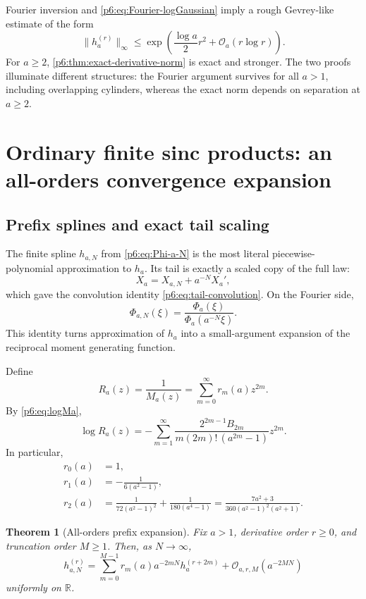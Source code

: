 \documentclass[11pt,oneside]{article}
\numberwithin{equation}{section}
\newtheorem{theorem}{Theorem}[section]
\theoremstyle{definition}
\theoremstyle{remark}
\newcommand{\R}{\mathbb R}
\newcommand{\bigO}{\mathcal O}
\begin{document}
Fourier inversion and \eqref{p6:eq:Fourier-logGaussian} imply a rough
Gevrey-like estimate of the form
\[
 \|h_a^{(r)}\|_\infty
 \le\exp\!\left(\frac{\log a}{2}r^2+\bigO_a(r\log r)\right).
\]
For $a\ge2$, \cref{p6:thm:exact-derivative-norm} is exact and stronger.  The two
proofs illuminate different structures: the Fourier argument survives for all
$a>1$, including overlapping cylinders, whereas the exact norm depends on
separation at $a\ge2$.

\section{Ordinary finite sinc products: an all-orders convergence expansion}

\subsection{Prefix splines and exact tail scaling}

The finite spline $h_{a,N}$ from \eqref{p6:eq:Phi-a-N} is the most literal
piecewise-polynomial approximation to $h_a$.  Its tail is exactly a scaled copy
of the full law:
\[
 X_a=X_{a,N}+a^{-N}X_a',
\]
which gave the convolution identity \eqref{p6:eq:tail-convolution}.  On the Fourier
side,
\begin{equation}\label{p6:eq:prefix-ratio}
 \Phi_{a,N}(\xi)
 =\frac{\Phi_a(\xi)}{\Phi_a(a^{-N}\xi)}.
\end{equation}
This identity turns approximation of $h_a$ into a small-argument expansion of
the reciprocal moment generating function.

Define
\begin{equation}\label{p6:eq:Ra}
 R_a(z)=\frac1{M_a(z)}
 =\sum_{m=0}^{\infty}r_m(a)z^{2m}.
\end{equation}
By \eqref{p6:eq:logMa},
\begin{equation}\label{p6:eq:logRa}
 \log R_a(z)=
 -\sum_{m=1}^{\infty}
 \frac{2^{2m-1}B_{2m}}
 {m(2m)!\,(a^{2m}-1)}z^{2m}.
\end{equation}
In particular,
\begin{align}
 r_0(a)&=1,\label{p6:eq:r0}\\
 r_1(a)&=-\frac1{6(a^2-1)},\label{p6:eq:r1}\\
 r_2(a)&=\frac1{72(a^2-1)^2}
 +\frac1{180(a^4-1)}
 =\frac{7a^2+3}{360(a^2-1)^2(a^2+1)}.
 \label{p6:eq:r2}
\end{align}

\begin{theorem}[All-orders prefix expansion]\label{p6:thm:prefix-expansion}
Fix $a>1$, derivative order $r\ge0$, and truncation order $M\ge1$.  Then, as
$N\to\infty$,
\begin{equation}\label{p6:eq:prefix-expansion}
 h_{a,N}^{(r)}
 =\sum_{m=0}^{M-1}
 r_m(a)a^{-2mN}h_a^{(r+2m)}
 +\bigO_{a,r,M}(a^{-2MN})
\end{equation}
uniformly on $\R$.
\end{theorem}
\end{document}
